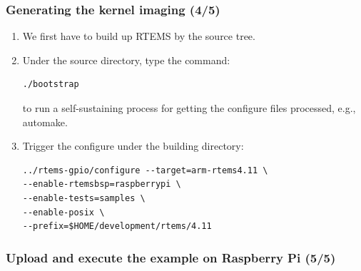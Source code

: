 \documentclass[t]{beamer}
\begin{document}
\begin{frame}[fragile]
\frametitle{Generating the kernel imaging (4/5)}
\begin{enumerate}
\item We first have to build up RTEMS by the source tree.
\item Under the source directory, type the command:
\begin{verbatim}
./bootstrap 
\end{verbatim}  
to run a self-sustaining process for getting the configure files processed, e.g., automake.
\item Trigger the configure under the building directory:
\begin{verbatim}
../rtems-gpio/configure --target=arm-rtems4.11 \
--enable-rtemsbsp=raspberrypi \
--enable-tests=samples \
--enable-posix \
--prefix=$HOME/development/rtems/4.11
\end{verbatim}   
\end{enumerate}

\end{frame}

\begin{frame}
\frametitle{Upload and execute the example on Raspberry Pi (5/5)}

\end{frame}
\end{document}
